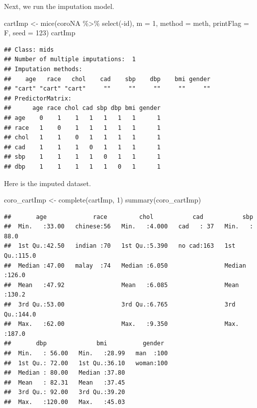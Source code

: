 \documentclass[
  10pt,
]{krantz}
\newenvironment{Shaded}{\begin{snugshade}}{\end{snugshade}}
\newcommand{\AttributeTok}[1]{\textcolor[rgb]{0.77,0.63,0.00}{#1}}
\newcommand{\DecValTok}[1]{\textcolor[rgb]{0.00,0.00,0.81}{#1}}
\newcommand{\FunctionTok}[1]{\textcolor[rgb]{0.00,0.00,0.00}{#1}}
\newcommand{\NormalTok}[1]{#1}
\newcommand{\OtherTok}[1]{\textcolor[rgb]{0.56,0.35,0.01}{#1}}
\newcommand{\SpecialCharTok}[1]{\textcolor[rgb]{0.00,0.00,0.00}{#1}}
\begin{document}
Next, we run the imputation model.

\begin{Shaded}
\begin{Highlighting}[]
\NormalTok{cartImp }\OtherTok{\textless{}{-}} \FunctionTok{mice}\NormalTok{(coroNA }\SpecialCharTok{\%\textgreater{}\%} \FunctionTok{select}\NormalTok{(}\SpecialCharTok{{-}}\NormalTok{id), }
                \AttributeTok{m =} \DecValTok{1}\NormalTok{, }\AttributeTok{method =}\NormalTok{ meth, }\AttributeTok{printFlag =}\NormalTok{ F, }\AttributeTok{seed =} \DecValTok{123}\NormalTok{)}
\NormalTok{cartImp}
\end{Highlighting}
\end{Shaded}

\begin{verbatim}
## Class: mids
## Number of multiple imputations:  1 
## Imputation methods:
##    age   race   chol    cad    sbp    dbp    bmi gender 
## "cart" "cart" "cart"     ""     ""     ""     ""     "" 
## PredictorMatrix:
##      age race chol cad sbp dbp bmi gender
## age    0    1    1   1   1   1   1      1
## race   1    0    1   1   1   1   1      1
## chol   1    1    0   1   1   1   1      1
## cad    1    1    1   0   1   1   1      1
## sbp    1    1    1   1   0   1   1      1
## dbp    1    1    1   1   1   0   1      1
\end{verbatim}

Here is the imputed dataset.

\begin{Shaded}
\begin{Highlighting}[]
\NormalTok{coro\_cartImp }\OtherTok{\textless{}{-}} \FunctionTok{complete}\NormalTok{(cartImp, }\DecValTok{1}\NormalTok{)}
\FunctionTok{summary}\NormalTok{(coro\_cartImp)}
\end{Highlighting}
\end{Shaded}

\begin{verbatim}
##       age             race         chol           cad           sbp       
##  Min.   :33.00   chinese:56   Min.   :4.000   cad   : 37   Min.   : 88.0  
##  1st Qu.:42.50   indian :70   1st Qu.:5.390   no cad:163   1st Qu.:115.0  
##  Median :47.00   malay  :74   Median :6.050                Median :126.0  
##  Mean   :47.92                Mean   :6.085                Mean   :130.2  
##  3rd Qu.:53.00                3rd Qu.:6.765                3rd Qu.:144.0  
##  Max.   :62.00                Max.   :9.350                Max.   :187.0  
##       dbp              bmi          gender   
##  Min.   : 56.00   Min.   :28.99   man  :100  
##  1st Qu.: 72.00   1st Qu.:36.10   woman:100  
##  Median : 80.00   Median :37.80              
##  Mean   : 82.31   Mean   :37.45              
##  3rd Qu.: 92.00   3rd Qu.:39.20              
##  Max.   :120.00   Max.   :45.03
\end{verbatim}
\end{document}
